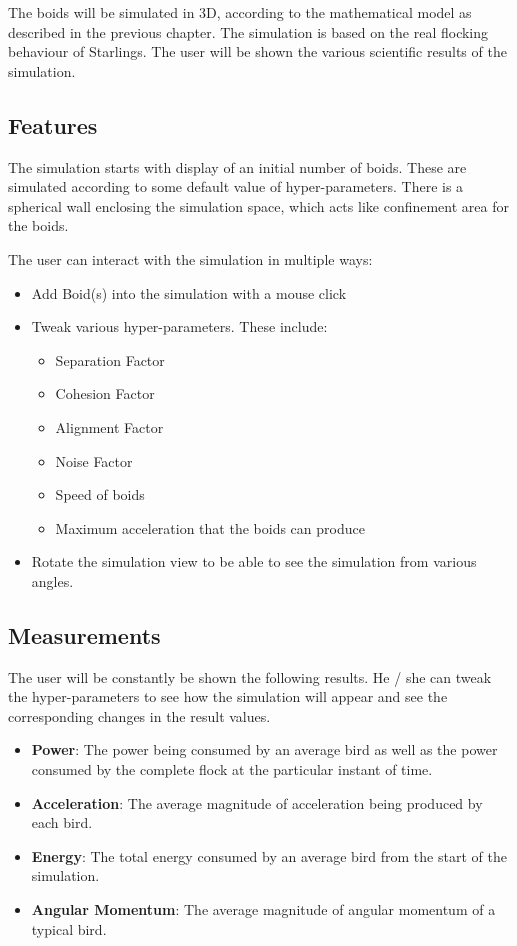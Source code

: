 \documentclass[a4paper,12pt,openany]{book}
\begin{document}
The boids will be simulated in 3D, according to the mathematical model as described in the previous chapter. The simulation is based on the real flocking behaviour of Starlings. The user will be shown the various scientific results of the simulation.

\subsection*{Features}

The simulation starts with display of an initial number of boids. These are simulated according to some default value of hyper-parameters. There is a spherical wall enclosing the simulation space, which acts like confinement area for the boids.

The user can interact with the simulation in multiple ways:
\begin{itemize}

\item Add Boid(s) into the simulation with a mouse click
\item Tweak various hyper-parameters. These include:
\begin{itemize}
\item Separation Factor
\item Cohesion Factor
\item Alignment Factor
\item Noise Factor
\item Speed of boids
\item Maximum acceleration that the boids can produce
\end{itemize} 

\item Rotate the simulation view to be able to see the simulation from various angles.

\end{itemize}

\subsection*{Measurements}
The user will be constantly be shown the following results. He / she can tweak the hyper-parameters to see how the simulation will appear and see the corresponding changes in the result values.
\begin{itemize}
\item \textbf{Power}: The power being consumed by an average bird as well as the power consumed by the complete flock at the particular instant of time.
\item \textbf{Acceleration}: The average magnitude of acceleration being produced by each bird.
\item \textbf{Energy}: The total energy consumed by an average bird from the start of the simulation.
\item \textbf{Angular Momentum}: The average magnitude of angular momentum of a typical bird.
\end{itemize}
\end{document}
